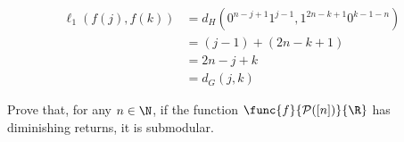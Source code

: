 \documentclass[a4paper, 12pt]{report}
\begin{document}
{\begin{itemize}
\begin{enumerate}
\begin{equation*}
\begin{split}
                                \ell_1(f(j), f(k)) &= d_H(0^{n - j + 1}1^{j - 1}, 1^{2n - k + 1}0^{k - 1- n}) \\
                                                   &= (j - 1) + (2n - k + 1) \\
                                                   &= 2n - j + k \\
                                                   &= d_G(j, k)
                            \end{split}
                        \end{equation*}
                \end{enumerate}
        \end{itemize}
    }

    \begin{framedprob}[label={submod ex}]{}
        Prove that, for any $n \in \N$, if the function $\func{f}{\mathcal P([n])}{\R}$ has diminishing returns, it is submodular.
    \end{framedprob}
\end{document}
